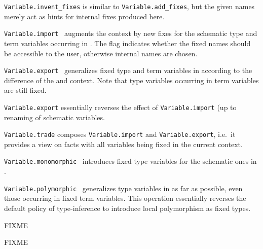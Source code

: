 \begin{isabellebody}
\begin{isamarkuptext}
\begin{description}
  \item \verb|Variable.invent_fixes| is similar to \verb|Variable.add_fixes|, but the given names merely act as hints for
  internal fixes produced here.

  \item \verb|Variable.import|~ augments the
  context by new fixes for the schematic type and term variables
  occurring in .  The  flag indicates
  whether the fixed names should be accessible to the user, otherwise
  internal names are chosen.

  \item \verb|Variable.export|~ generalizes
  fixed type and term variables in  according to the
  difference of the  and  context.  Note
  that type variables occurring in term variables are still fixed.

  \verb|Variable.export| essentially reverses the effect of \verb|Variable.import| (up to renaming of schematic variables.

  \item \verb|Variable.trade| composes \verb|Variable.import| and \verb|Variable.export|, i.e.\ it provides a view on facts with all
  variables being fixed in the current context.

  \item \verb|Variable.monomorphic|~ introduces fixed
  type variables for the schematic ones in .

  \item \verb|Variable.polymorphic|~ generalizes type
  variables in  as far as possible, even those occurring
  in fixed term variables.  This operation essentially reverses the
  default policy of type-inference to introduce local polymorphism as
  fixed types.

  \end{description}%
\end{isamarkuptext}%
\isamarkuptrue%
%
\endisatagmlref
{\isafoldmlref}%
%
\isadelimmlref
%
\endisadelimmlref
%
\begin{isamarkuptext}%
FIXME%
\end{isamarkuptext}%
\isamarkuptrue%
%
\isamarkuptrue%
%
\begin{isamarkuptext}%
FIXME



\end{isamarkuptext}
\end{isabellebody}
